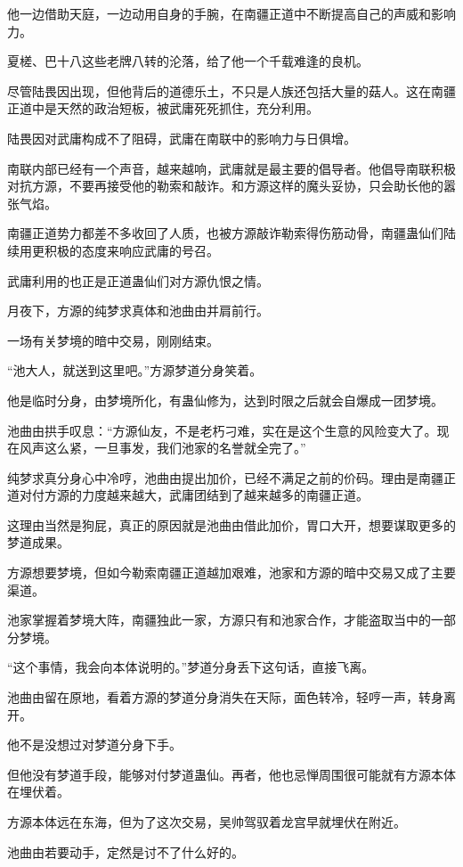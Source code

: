 \begin{this_body}
他一边借助天庭，一边动用自身的手腕，在南疆正道中不断提高自己的声威和影响力。

夏槎、巴十八这些老牌八转的沦落，给了他一个千载难逢的良机。

尽管陆畏因出现，但他背后的道德乐土，不只是人族还包括大量的菇人。这在南疆正道中是天然的政治短板，被武庸死死抓住，充分利用。

陆畏因对武庸构成不了阻碍，武庸在南联中的影响力与日俱增。

南联内部已经有一个声音，越来越响，武庸就是最主要的倡导者。他倡导南联积极对抗方源，不要再接受他的勒索和敲诈。和方源这样的魔头妥协，只会助长他的嚣张气焰。

南疆正道势力都差不多收回了人质，也被方源敲诈勒索得伤筋动骨，南疆蛊仙们陆续用更积极的态度来响应武庸的号召。

武庸利用的也正是正道蛊仙们对方源仇恨之情。

月夜下，方源的纯梦求真体和池曲由并肩前行。

一场有关梦境的暗中交易，刚刚结束。

“池大人，就送到这里吧。”方源梦道分身笑着。

他是临时分身，由梦境所化，有蛊仙修为，达到时限之后就会自爆成一团梦境。

池曲由拱手叹息：“方源仙友，不是老朽刁难，实在是这个生意的风险变大了。现在风声这么紧，一旦事发，我们池家的名誉就全完了。”

纯梦求真分身心中冷哼，池曲由提出加价，已经不满足之前的价码。理由是南疆正道对付方源的力度越来越大，武庸团结到了越来越多的南疆正道。

这理由当然是狗屁，真正的原因就是池曲由借此加价，胃口大开，想要谋取更多的梦道成果。

方源想要梦境，但如今勒索南疆正道越加艰难，池家和方源的暗中交易又成了主要渠道。

池家掌握着梦境大阵，南疆独此一家，方源只有和池家合作，才能盗取当中的一部分梦境。

“这个事情，我会向本体说明的。”梦道分身丢下这句话，直接飞离。

池曲由留在原地，看着方源的梦道分身消失在天际，面色转冷，轻哼一声，转身离开。

他不是没想过对梦道分身下手。

但他没有梦道手段，能够对付梦道蛊仙。再者，他也忌惮周围很可能就有方源本体在埋伏着。

方源本体远在东海，但为了这次交易，吴帅驾驭着龙宫早就埋伏在附近。

池曲由若要动手，定然是讨不了什么好的。


\end{this_body}

